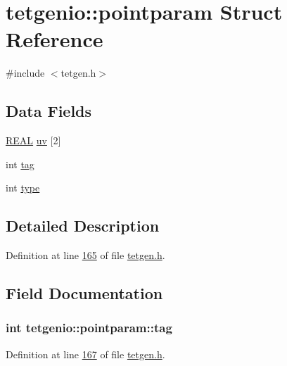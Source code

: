 \hypertarget{structtetgenio_1_1pointparam}{}\section{tetgenio\+:\+:pointparam Struct Reference}
\label{structtetgenio_1_1pointparam}


{\ttfamily \#include $<$tetgen.\+h$>$}

\subsection*{Data Fields}
\begin{DoxyCompactItemize}
\item 
\hyperlink{tetgen_8h_a4b654506f18b8bfd61ad2a29a7e38c25}{R\+E\+AL} \hyperlink{structtetgenio_1_1pointparam_a043a61660f4b9f0e164c91692fdb0ee5}{uv} \mbox{[}2\mbox{]}
\item 
int \hyperlink{structtetgenio_1_1pointparam_aa7ad61c79f963c3d198d5f48f5501f52}{tag}
\item 
int \hyperlink{structtetgenio_1_1pointparam_a172c5af02af4fe6ab385df812c1ea1ff}{type}
\end{DoxyCompactItemize}


\subsection{Detailed Description}


Definition at line \hyperlink{tetgen_8h_source_l00165}{165} of file \hyperlink{tetgen_8h_source}{tetgen.\+h}.



\subsection{Field Documentation}
\subsubsection[{\texorpdfstring{tag}{tag}}]{\setlength{\rightskip}{0pt plus 5cm}int tetgenio\+::pointparam\+::tag}\hypertarget{structtetgenio_1_1pointparam_aa7ad61c79f963c3d198d5f48f5501f52}{}\label{structtetgenio_1_1pointparam_aa7ad61c79f963c3d198d5f48f5501f52}


Definition at line \hyperlink{tetgen_8h_source_l00167}{167} of file \hyperlink{tetgen_8h_source}{tetgen.\+h}.

